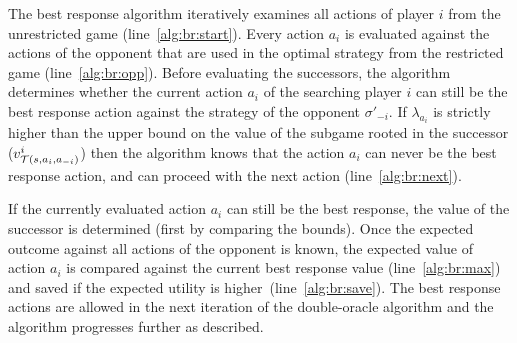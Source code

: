 The best response algorithm iteratively examines all actions of player $i$ from the unrestricted game (line~\ref{alg:br:start}).
Every action $a_i$ is evaluated against the actions of the opponent that are used in the optimal strategy from the restricted game (line~\ref{alg:br:opp}).
Before evaluating the successors, the algorithm determines whether the current action $a_i$ of the searching player $i$ can still be the best response action
against the strategy of the opponent $\sigma'_{-i}$.
If $\lambda_{a_i}$ is strictly higher than the upper bound on the value of the subgame rooted in the successor (\ie $v^i_{\mathcal{T}(s,a_i,a_{-i})}$) then the algorithm knows that the action $a_i$ can never be the best response action, and can proceed with the next action (line~\ref{alg:br:next}).
%

If the currently evaluated action $a_i$ can still be the best response, the value of the successor is determined (first by comparing the bounds). Once the expected outcome against all actions of the opponent is known, the expected value of action $a_i$ is compared against the current best response value (line~\ref{alg:br:max}) and saved if the expected utility is higher~(line~\ref{alg:br:save}). The best response actions are allowed in the next iteration of the double-oracle algorithm and the algorithm progresses further as described.

